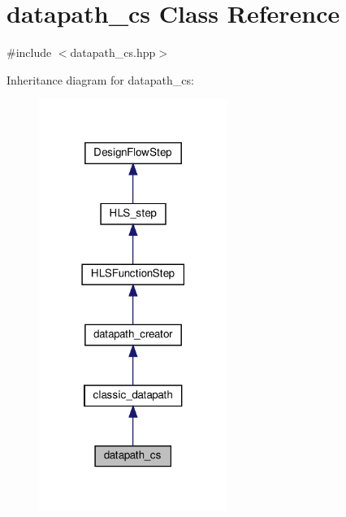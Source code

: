 \hypertarget{classdatapath__cs}{}\section{datapath\+\_\+cs Class Reference}
\label{classdatapath__cs}


{\ttfamily \#include $<$datapath\+\_\+cs.\+hpp$>$}



Inheritance diagram for datapath\+\_\+cs\+:
\nopagebreak
\begin{figure}[H]
\begin{center}
\leavevmode
\includegraphics[width=174pt]{dd/d23/classdatapath__cs__inherit__graph}
\end{center}
\end{figure}



